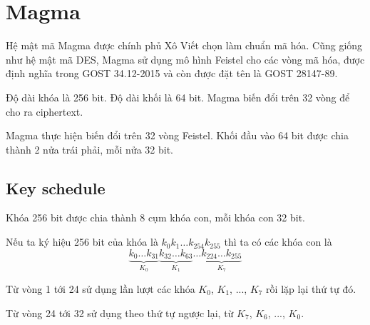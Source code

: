 \chapter{Magma}

Hệ mật mã Magma được chính phủ Xô Viết chọn làm chuẩn mã hóa.
Cũng giống như hệ mật mã DES, Magma sử dụng mô hình Feistel
cho các vòng mã hóa, được định nghĩa trong GOST 34.12-2015
và còn được đặt tên là GOST 28147-89.

Độ dài khóa là 256 bit. Độ dài khối là 64 bit. Magma biến
đổi trên 32 vòng để cho ra ciphertext.

Magma thực hiện biến đổi trên 32 vòng Feistel. Khối đầu vào 
64 bit được chia thành 2 nửa trái phải, mỗi nửa 32 bit.

\section{Key schedule}

Khóa 256 bit được chia thành 8 cụm khóa con, mỗi khóa con 32 bit.

Nếu ta ký hiệu 256 bit của khóa là $k_{0} k_{1} \ldots k_{254} k_{255}$
thì ta có các khóa con là
\[ \underbrace{k_0 \ldots k_{31}}_{K_0} \underbrace{k_{32} \ldots k_{63}}_{K_1}
    \ldots \underbrace{k_{224} \ldots k_{255}}_{K_7}\]

Từ vòng 1 tới 24 sử dụng lần lượt các khóa $K_0$, $K_1$, ..., $K_7$
rồi lặp lại thứ tự đó.

Từ vòng 24 tới 32 sử dụng theo thứ tự ngược lại, từ $K_7$, $K_6$, ...,
$K_0$.

